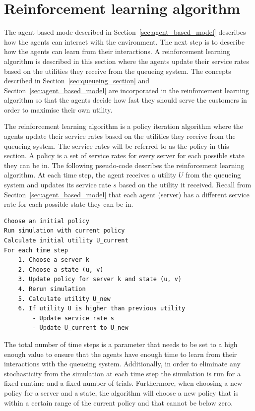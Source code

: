\section{Reinforcement learning algorithm}\label{sec:reinforcement_learning}

The agent based mode described in Section~\ref{sec:agent_based_model} describes
how the agents can interact with the environment.
The next step is to describe how the agents can learn from their interactions.
A reinforcement learning algorithm is described in this section where the agents
update their service rates based on the utilities they receive from the
queueing system.
The concepts described in Section~\ref{sec:queueing_section} and
Section~\ref{sec:agent_based_model} are incorporated in the reinforcement
learning algorithm so that the agents decide how fast they should serve the
customers in order to maximise their own utility.

The reinforcement learning algorithm is a policy iteration algorithm where
the agents update their service rates based on the utilities they receive
from the queueing system.
The service rates will be referred to as the policy in this section.
A policy is a set of service rates for every server for each possible state
they can be in.
The following pseudo-code describes the reinforcement learning algorithm.
At each time step, the agent receives a utility $U$ from the queueing system
and updates its service rate $s$ based on the utility it received.
Recall from Section~\ref{sec:agent_based_model} that each agent (server) has
a different service rate for each possible state they can be in.

\vspace*{0.5cm}

\begin{lstlisting}
Choose an initial policy
Run simulation with current policy
Calculate initial utility U_current
For each time step
    1. Choose a server k
    2. Choose a state (u, v)
    3. Update policy for server k and state (u, v)
    4. Rerun simulation
    5. Calculate utility U_new
    6. If utility U is higher than previous utility
        - Update service rate s
        - Update U_current to U_new

\end{lstlisting}


The total number of time steps is a parameter that needs to be set to a high
enough value to ensure that the agents have enough time to learn from their
interactions with the queueing system.
Additionally, in order to eliminate any stochasticity from the simulation
at each time step the simulation is run for a fixed runtime and a fixed number
of trials.
Furthermore, when choosing a new policy for a server and a state, the
algorithm will choose a new policy that is within a certain range of the
current policy and that cannot be below zero.

